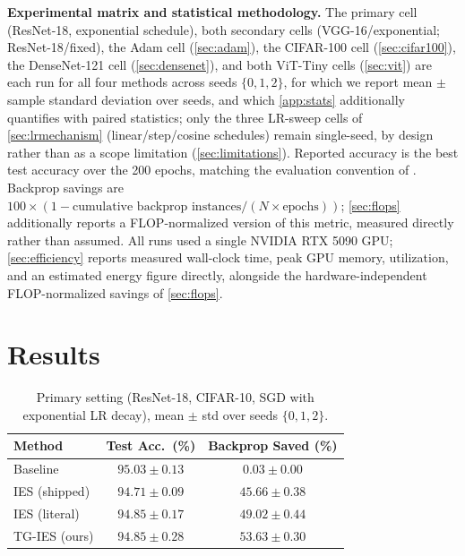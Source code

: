 \documentclass{article}
\newcommand{\win}[1]{\cellcolor{tgwin}#1}
\newcommand{\lose}[1]{\cellcolor{tglose}#1}
\theoremstyle{plain}
\theoremstyle{definition}
\theoremstyle{remark}
\begin{document}
\textbf{Experimental matrix and statistical methodology.} The primary cell (ResNet-18, exponential schedule), both secondary cells (VGG-16/exponential; ResNet-18/fixed), the Adam cell (\cref{sec:adam}), the CIFAR-100 cell (\cref{sec:cifar100}), the DenseNet-121 cell (\cref{sec:densenet}), and both ViT-Tiny cells (\cref{sec:vit}) are each run for all four methods across seeds $\{0,1,2\}$, for which we report mean $\pm$ sample standard deviation over seeds, and which \cref{app:stats} additionally quantifies with paired statistics; only the three LR-sweep cells of \cref{sec:lrmechanism} (linear/step/cosine schedules) remain single-seed, by design rather than as a scope limitation (\cref{sec:limitations}). Reported accuracy is the best test accuracy over the 200 epochs, matching the evaluation convention of \citet{yuan2025instance}. Backprop savings are $100\times(1 - \text{cumulative backprop instances}/(N\times\text{epochs}))$; \cref{sec:flops} additionally reports a FLOP-normalized version of this metric, measured directly rather than assumed. All runs used a single NVIDIA RTX 5090 GPU; \cref{sec:efficiency} reports measured wall-clock time, peak GPU memory, utilization, and an estimated energy figure directly, alongside the hardware-independent FLOP-normalized savings of \cref{sec:flops}.

\section{Results}
\label{sec:results}

\begin{table}[t]
\caption{Primary setting (ResNet-18, CIFAR-10, SGD with exponential LR decay), mean $\pm$ std over seeds $\{0,1,2\}$.}
\label{tab:primary}
\vskip 0.1in
\begin{center}
\begin{small}
\begin{tabular}{lcc}
\toprule
Method & Test Acc.\ (\%) & Backprop Saved (\%) \\
\midrule
Baseline & $95.03 \pm 0.13$ & $0.03 \pm 0.00$ \\
IES (shipped) & $94.71 \pm 0.09$ & $45.66 \pm 0.38$ \\
IES (literal) & $94.85 \pm 0.17$ & $49.02 \pm 0.44$ \\
\win{TG-IES (ours)} & \lose{$94.85 \pm 0.28$} & \win{$\mathbf{53.63 \pm 0.30}$} \\
\bottomrule
\end{tabular}
\end{small}
\end{center}
\vskip -0.1in
\end{table}
\end{document}
